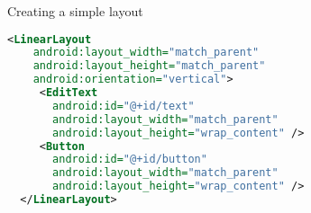 \begin{frame}[fragile]{Creating a simple layout}
  \begin{lstlisting}[language=XML]
  <LinearLayout
    android:layout_width="match_parent"
    android:layout_height="match_parent"
    android:orientation="vertical">
     <EditText
       android:id="@+id/text"
       android:layout_width="match_parent"
       android:layout_height="wrap_content" />
     <Button
       android:id="@+id/button"
       android:layout_width="match_parent"
       android:layout_height="wrap_content" />
  </LinearLayout>
  \end{lstlisting}
\end{frame}
